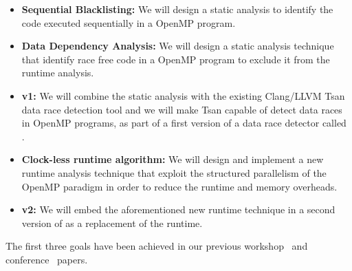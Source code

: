 \begin{itemize}
\item \textbf{Sequential Blacklisting:} We will design a static analysis to
  identify the code executed sequentially in a OpenMP program.
\item \textbf{Data Dependency Analysis:} We will design a static analysis
  technique that identify race free code in a OpenMP program to exclude it
  from the runtime analysis.
\item \textbf{\archer v1:} We will combine the static analysis with the
  existing Clang/LLVM Tsan data race detection tool and we will make Tsan
  capable of detect data races in OpenMP programs, as part of a first version
  of a data race detector called \archer.
\item \textbf{Clock-less runtime algorithm:} We will design and implement a
  new runtime analysis technique that exploit the structured parallelism of
  the OpenMP paradigm in order to reduce the runtime and memory overheads.
\item \textbf{\archer v2:} We will embed the aforementioned new runtime
  technique in a second version of \archer as a replacement of the \tsan
  runtime.
\end{itemize}

The first three goals have been achieved in our previous
workshop~\cite{Protze:2014:TPL:2688361.2688369} and
conference~\cite{atzeni2016} papers.

